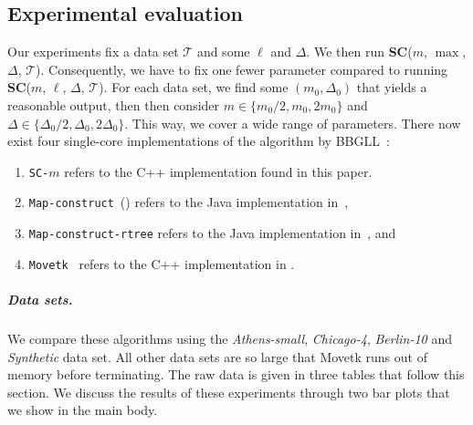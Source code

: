     \subsection{Experimental evaluation}
    \label{sub:comparison} 
%
%
%
Our experiments fix a data set $\mathcal{T}$ and some $\ell$ and $\Delta$. 
We then run \textbf{SC}($m$, $\max$, $\Delta$, $\mathcal{T}$).
Consequently, we have to fix one fewer parameter compared to running \textbf{SC}($m$, $\ell$, $\Delta$, $\mathcal{T}$). 
For each data set, we find some $(m_0, \Delta_0)$ that yields a reasonable output, then then consider $m \in \{m_0/2, m_0, 2 m_0\}$ and $\Delta \in \{\Delta_0/2, \Delta_0, 2 \Delta_0\}$.
This way, we cover a wide range of parameters.
There now exist four single-core implementations of the algorithm by BBGLL~\cite{buchin2011detecting}:
%
\begin{enumerate}
    \item \texttt{SC-$m$} refers to the C++ implementation found in this paper. 
    \item \texttt{Map-construct}~(\cite{buchin2017clustering}) refers to the Java implementation in~\cite{buchin2017clustering},
    \item \texttt{Map-construct-rtree} refers to the Java implementation in~\cite{buchin2020improved}, and
    \item \texttt{Movetk}~\cite{movetk} refers to the C++ implementation in \cite{movetk}. 
\end{enumerate}
%
\subparagraph{Data sets.}
We compare these algorithms using the \emph{Athens-small}, \emph{Chicago-4}, \emph{Berlin-10} and \emph{Synthetic} data set.
All other data sets are so large that Movetk runs out of memory before terminating. 
The raw data is given in three tables that follow this section.
We discuss the results of these experiments through two bar plots that we show in the main body. 
%
%
\clearpage
%
